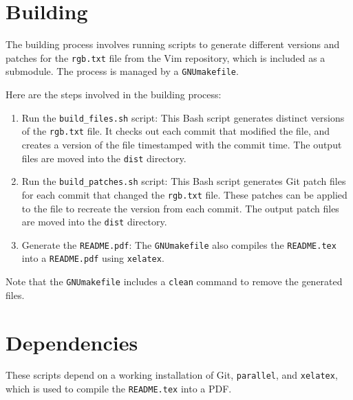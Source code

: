 \documentclass{article}
\begin{document}
\section*{Building}

The building process involves running scripts to generate different versions and patches for the \texttt{rgb.txt} file from the Vim repository, which is included as a submodule. The process is managed by a \texttt{GNUmakefile}. 

Here are the steps involved in the building process:

\begin{enumerate}
    \item Run the \texttt{build\_files.sh} script: This Bash script generates distinct versions of the \texttt{rgb.txt} file. It checks out each commit that modified the file, and creates a version of the file timestamped with the commit time. The output files are moved into the \texttt{dist} directory.
    \item Run the \texttt{build\_patches.sh} script: This Bash script generates Git patch files for each commit that changed the \texttt{rgb.txt} file. These patches can be applied to the file to recreate the version from each commit. The output patch files are moved into the \texttt{dist} directory.
    \item Generate the \texttt{README.pdf}: The \texttt{GNUmakefile} also compiles the \texttt{README.tex} into a \texttt{README.pdf} using \texttt{xelatex}.
\end{enumerate}

Note that the \texttt{GNUmakefile} includes a \texttt{clean} command to remove the generated files.

\section*{Dependencies}

These scripts depend on a working installation of Git, \texttt{parallel}, and \texttt{xelatex}, which is used to compile the \texttt{README.tex} into a PDF.
\end{document}
